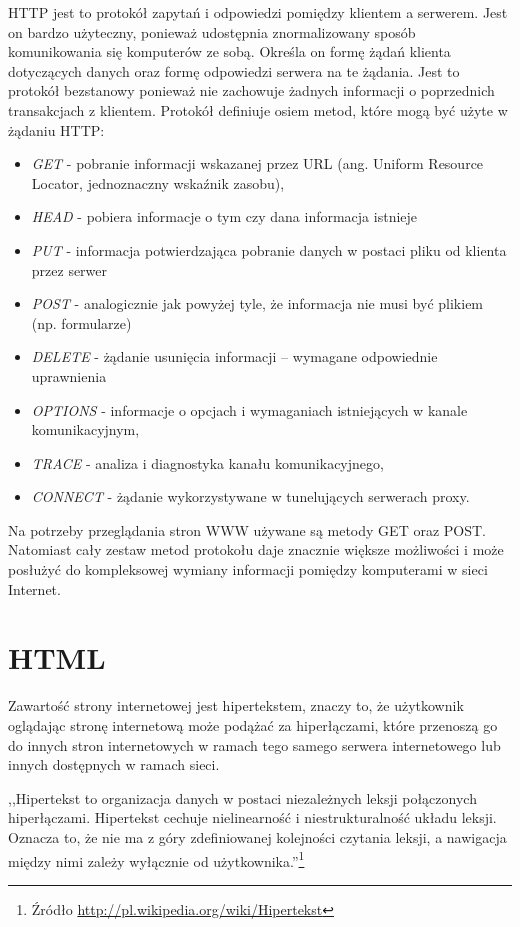 \documentclass[a4paper,12pt,oneside]{report}
\begin{document}
HTTP jest to protokół zapytań i odpowiedzi pomiędzy klientem a serwerem. Jest on bardzo użyteczny, ponieważ udostępnia znormalizowany sposób komunikowania się komputerów ze sobą. Określa on formę żądań klienta dotyczących danych oraz formę odpowiedzi serwera na te żądania. Jest to protokół bezstanowy ponieważ nie zachowuje żadnych informacji o poprzednich transakcjach z klientem. Protokół definiuje osiem metod, które mogą być użyte w żądaniu HTTP:
\begin{itemize}
  \item \emph{GET} - pobranie informacji wskazanej przez URL (ang. Uniform Resource Locator, jednoznaczny wskaźnik zasobu),
  \item \emph{HEAD} - pobiera informacje o tym czy dana informacja istnieje
  \item \emph{PUT} - informacja potwierdzająca pobranie danych w postaci pliku od klienta przez serwer
  \item \emph{POST} - analogicznie jak powyżej tyle, że informacja nie musi być plikiem (np. formularze)
  \item \emph{DELETE} - żądanie usunięcia informacji -- wymagane odpowiednie uprawnienia
  \item \emph{OPTIONS} - informacje o opcjach i wymaganiach istniejących w kanale komunikacyjnym, 
  \item \emph{TRACE} - analiza i diagnostyka kanału komunikacyjnego, 
  \item \emph{CONNECT} - żądanie wykorzystywane w tunelujących serwerach proxy.
\end{itemize}

Na potrzeby przeglądania stron WWW używane są metody GET oraz POST. Natomiast cały zestaw metod protokołu daje znacznie większe możliwości i może posłużyć do kompleksowej wymiany informacji pomiędzy komputerami w sieci Internet.

\section{HTML}
\label{sec:html}
Zawartość strony internetowej jest hipertekstem, znaczy to, że użytkownik oglądając stronę internetową może podążać za hiperłączami, które przenoszą go do innych stron internetowych w ramach tego samego serwera internetowego lub innych dostępnych w ramach sieci.

,,Hipertekst to organizacja danych w postaci niezależnych leksji połączonych hiperłączami. Hipertekst cechuje nielinearność i niestrukturalność układu leksji. Oznacza to, że nie ma z góry zdefiniowanej kolejności czytania leksji, a nawigacja między nimi zależy wyłącznie od użytkownika.''\footnote{Źródło \url{http://pl.wikipedia.org/wiki/Hipertekst}}
\end{document}
